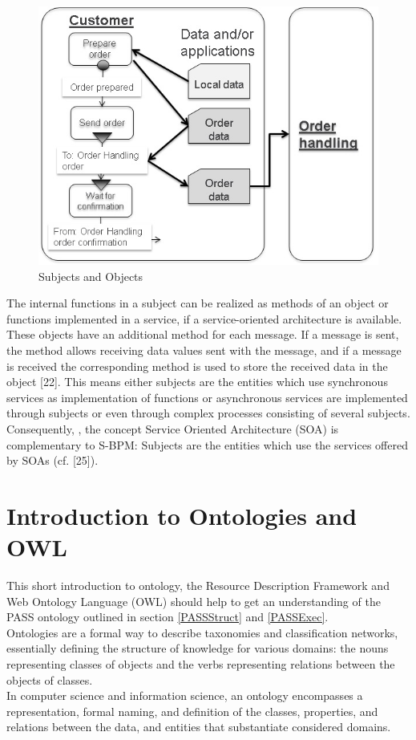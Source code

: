 \begin{figure}[ph]
	\centering
	\includegraphics[width=0.7\linewidth]{20181026-Ontologie-Bilder/Grafiken-Ontologie/SUbjectExecution/SUbjectObject}
	\caption[Subjects and Objects]{Subjects and Objects}
	\label{fig:subjectobject}
\end{figure}

The internal functions in a subject can be realized as methods of an object or functions implemented in a service, if a service-oriented architecture is available. These objects have an additional method for each message. If a message is sent, the method allows receiving data values sent with the message, and if a message is received the corresponding method is used to store the received data in the object [22]. This means either subjects are the entities which use synchronous services as implementation of functions or asynchronous services are implemented through subjects or even through complex processes consisting of several subjects. Consequently, , the concept Service Oriented Architecture (SOA) is complementary to S-BPM: Subjects are the entities which use the services offered by SOAs (cf. [25]).

\section{Introduction to Ontologies and OWL }
\label{IntroOntology}

This short introduction to ontology, the Resource Description Framework and Web Ontology Language (OWL) should help to get an understanding of the PASS ontology outlined in section \ref{PASSStruct} and \ref{PASSExec}.\\
Ontologies are a formal way to describe taxonomies and classification networks, essentially defining the structure of knowledge for various domains: the nouns representing classes of objects and the verbs representing relations between the objects of classes.\\
In computer science and information science, an ontology encompasses a representation, formal naming, and definition of the classes, properties, and relations between the data, and entities that substantiate considered domains.\\

